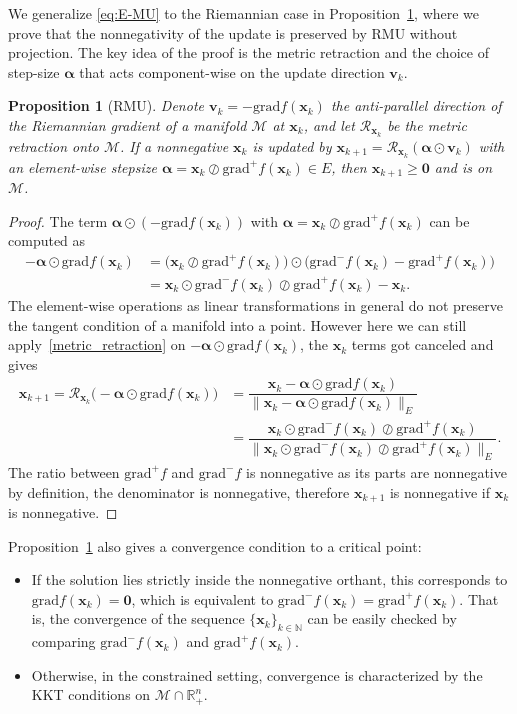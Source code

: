 \documentclass[sn-mathphys-num]{sn-jnl}
\def\grad            {\textrm{grad}}     %
\def\zeros           {\bm{0}}            %
\def\IN {\mathbb{N}} 		%
\def\IR  {\mathbb{R}} 	    %
\def\IRn {\IR^{n}} 			%
\def\v {\bm{v}}
\def\x {\bm{x}}
\def\cM { \mathcal{M}}
\def\cR { \mathcal{R}}
\def\balpha   {\boldsymbol{\alpha}}
\newtheorem{proposition}[theorem]{Proposition}
\begin{document}
We generalize \eqref{eq:E-MU} to the Riemannian case in Proposition~\ref{prop:RMU_update}, where we prove that the nonnegativity of the update is preserved by RMU without projection.
The key idea of the proof is the metric retraction and the choice of step-size $\balpha$ that acts component-wise on the update direction $\v_k$.


\begin{proposition}[RMU]\label{prop:RMU_update}
Denote $\v_k = - \grad f(\x_k)$ the anti-parallel direction of the Riemannian gradient of a manifold $\cM$ at $\x_k$, and let $\cR_{\x_k}$ be the metric retraction onto $\cM$.
If a nonnegative $\x_k$ is updated by $\x_{k+1} = \cR_{\x_k}( \balpha \odot  \v_k)$
with an element-wise stepsize $\balpha=\x_k \oslash \grad^+ f(\x_k) \in E$, then $\x_{k+1} \geq \zeros$ and is on $\cM$.
\end{proposition}
    \begin{proof}
The term $\balpha \odot  (-\grad f(\x_k))$ with $\balpha=\x_k \oslash \grad^+ f(\x_k)$ can be computed as 
\[
\begin{array}{lll}
-\balpha \odot  \grad f(\x_k) 
&=
\big( \x_k \oslash \grad^+ f(\x_k) \big)  \odot  \big( \grad^- f(\x_k) - \grad^+ f(\x_k) \big)
\\
&=
\x_k \odot \grad^- f(\x_k) \oslash \grad^+ f(\x_k) - \x_k .
\end{array}
\]
The element-wise operations as linear transformations  in general do not preserve the tangent condition of a manifold into a point.
However here we can still apply~\eqref{metric_retraction} on $-\balpha \odot  \grad f(\x_k)$, the $\x_k$ terms got canceled and gives
\[
\begin{array}{ll}
\x_{k+1} 
=
\cR_{\x_k}\big( -\balpha \odot  \grad f(\x_k)\big) 
&=
\dfrac{\x_k - \balpha \odot  \grad f(\x_k)}{\| \x_k - \balpha \odot  \grad f(\x_k) \|_E}
\\
&= 
\dfrac{ \x_k \odot \grad^- f(\x_k) \oslash \grad^+ f(\x_k)}
{
\|  \x_k \odot \grad^- f(\x_k) \oslash \grad^+ f(\x_k) \|_E
}.    
\end{array}
\]
The ratio between $\grad^+ f$ and $\grad^- f$ is nonnegative as its parts are nonnegative by definition, the denominator is nonnegative, therefore $\x_{k+1}$ is nonnegative if $\x_k$ is nonnegative.
\end{proof}
 
Proposition~\ref{prop:RMU_update} also gives a convergence condition to a critical point: 
\begin{itemize}
    \item If the solution lies strictly inside the nonnegative orthant, this corresponds to $\grad f (\x_k) = \zeros$, which is equivalent to $\grad^- f(\x_k) = \grad^+ f(\x_k)$. 
    That is, the convergence of the sequence $\{\x_k\}_{k \in \IN}$ can be easily checked by comparing $\grad^- f(\x_k)$ and $\grad^+ f(\x_k)$.

    \item Otherwise, in the constrained setting, convergence is characterized by the KKT conditions on $\cM \cap \IRn_+$.
\end{itemize}
\end{document}
